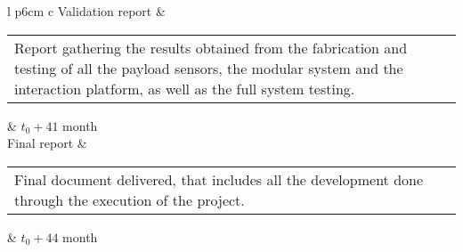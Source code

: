 \begin{longtable}[H]{l p{6cm} c}
	Validation report & \begin{tabular}[c]{@{}l@{}}\begin{minipage}[t]{\linewidth}
			Report gathering the results obtained from the fabrication and testing of all the payload sensors, the modular system and the interaction platform, as well as the full system testing. \vspace{0.3cm}
	\end{minipage} \end{tabular}   & $t_0 +41$ month                                                                                                                                           \\  \hline
	Final report & \begin{tabular}[c]{@{}l@{}}\begin{minipage}[t]{\linewidth}
			Final document delivered, that includes all the development done through the execution of the project. \vspace{0.3cm}
	\end{minipage} \end{tabular}   & $t_0 + 44$ month                                                                                                                                           
	
		\\ \bottomrule[2pt]
	\caption{Project Deliverables}
\end{longtable}


